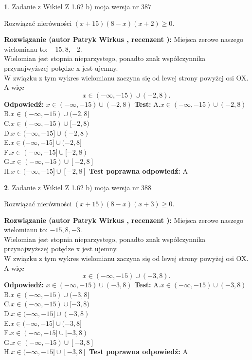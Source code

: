 \documentclass[12pt, a4paper]{article}
\theoremstyle{definition} %
\newtheorem{zad}{}
\newcommand{\zadStart}[1]{\begin{zad}#1\newline}
\newcommand{\zadStop}{\end{zad}}
\newcommand{\rozwStart}[2]{\noindent \textbf{Rozwiązanie (autor #1 , recenzent #2): }\newline}
\newcommand{\rozwStop}{\newline}
\newcommand{\odpStart}{\noindent \textbf{Odpowiedź:}\newline}
\newcommand{\odpStop}{\newline}
\newcommand{\testStart}{\noindent \textbf{Test:}\newline}
\newcommand{\testStop}{\newline}
\newcommand{\kluczStart}{\noindent \textbf{Test poprawna odpowiedź:}\newline}
\newcommand{\kluczStop}{\newline}
\begin{document}
\zadStart{Zadanie z Wikieł Z 1.62 b) moja wersja nr 387}

Rozwiązać nierówności $(x+15)(8-x)(x+2)\ge0$.
\zadStop
\rozwStart{Patryk Wirkus}{}
Miejsca zerowe naszego wielomianu to: $-15, 8, -2$.\\
Wielomian jest stopnia nieparzystego, ponadto znak współczynnika przy\linebreak najwyższej potędze x jest ujemny.\\ W związku z tym wykres wielomianu zaczyna się od lewej strony powyżej osi OX. A więc $$x \in (-\infty,-15) \cup (-2,8).$$
\rozwStop
\odpStart
$x \in (-\infty,-15) \cup (-2,8)$
\odpStop
\testStart
A.$x \in (-\infty,-15) \cup (-2,8)$\\
B.$x \in (-\infty,-15) \cup (-2,8]$\\
C.$x \in (-\infty,-15) \cup [-2,8)$\\
D.$x \in (-\infty,-15] \cup (-2,8)$\\
E.$x \in (-\infty,-15] \cup (-2,8]$\\
F.$x \in (-\infty,-15] \cup [-2,8)$\\
G.$x \in (-\infty,-15) \cup [-2,8]$\\
H.$x \in (-\infty,-15] \cup [-2,8]$
\testStop
\kluczStart
A
\kluczStop



\zadStart{Zadanie z Wikieł Z 1.62 b) moja wersja nr 388}

Rozwiązać nierówności $(x+15)(8-x)(x+3)\ge0$.
\zadStop
\rozwStart{Patryk Wirkus}{}
Miejsca zerowe naszego wielomianu to: $-15, 8, -3$.\\
Wielomian jest stopnia nieparzystego, ponadto znak współczynnika przy\linebreak najwyższej potędze x jest ujemny.\\ W związku z tym wykres wielomianu zaczyna się od lewej strony powyżej osi OX. A więc $$x \in (-\infty,-15) \cup (-3,8).$$
\rozwStop
\odpStart
$x \in (-\infty,-15) \cup (-3,8)$
\odpStop
\testStart
A.$x \in (-\infty,-15) \cup (-3,8)$\\
B.$x \in (-\infty,-15) \cup (-3,8]$\\
C.$x \in (-\infty,-15) \cup [-3,8)$\\
D.$x \in (-\infty,-15] \cup (-3,8)$\\
E.$x \in (-\infty,-15] \cup (-3,8]$\\
F.$x \in (-\infty,-15] \cup [-3,8)$\\
G.$x \in (-\infty,-15) \cup [-3,8]$\\
H.$x \in (-\infty,-15] \cup [-3,8]$
\testStop
\kluczStart
A
\kluczStop
\end{document}
